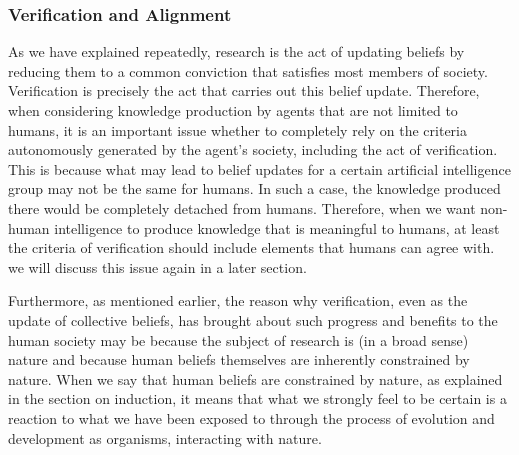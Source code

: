 \documentclass{book}
\begin{document}



\subsubsection{Verification and Alignment}

As we have explained repeatedly, research is the act of updating beliefs by reducing them to a common conviction that satisfies most members of society. Verification is precisely the act that carries out this belief update. Therefore, when considering knowledge production by agents that are not limited to humans, it is an important issue whether to completely rely on the criteria autonomously generated by the agent's society, including the act of verification. This is because what may lead to belief updates for a certain artificial intelligence group may not be the same for humans. In such a case, the knowledge produced there would be completely detached from humans. Therefore, when we want non-human intelligence to produce knowledge that is meaningful to humans, at least the criteria of verification should include elements that humans can agree with. we will discuss this issue again in a later section.

Furthermore, as mentioned earlier, the reason why verification, even as the update of collective beliefs, has brought about such progress and benefits to the human society may be because the subject of research is (in a broad sense) nature and because human beliefs themselves are inherently constrained by nature. When we say that human beliefs are constrained by nature, as explained in the section on induction, it means that what we strongly feel to be certain is a reaction to what we have been exposed to through the process of evolution and development as organisms, interacting with nature.
\end{document}
